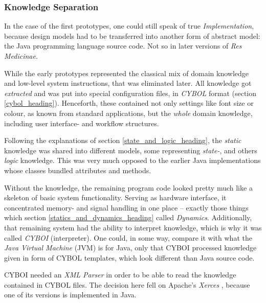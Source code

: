%
%
%
%
%
%
%

\subsubsection{Knowledge Separation}
\label{knowledge_separation_heading}

In the case of the first prototypes, one could still speak of true
\emph{Implementation}, because design models had to be transferred into another
form of abstract model: the Java programming language source code. Not so in
later versions of \emph{Res Medicinae}.

While the early prototypes represented the classical mix of domain knowledge
and low-level system instructions, that was eliminated later. All knowledge got
\emph{extracted} and was put into special configuration files, in \emph{CYBOL}
format (section \ref{cybol_heading}). Henceforth, these contained not only
settings like font size or colour, as known from standard applications, but the
\emph{whole} domain knowledge, including user interface- and workflow structures.

Following the explanations of section \ref{state_and_logic_heading}, the
\emph{static} knowledge was shared into different models, some representing
\emph{state-}, and others \emph{logic} knowledge. This was very much opposed to
the earlier Java implementations whose classes bundled attributes and methods.

Without the knowledge, the remaining program code looked pretty much like a
skeleton of basic system functionality. Serving as hardware interface, it
concentrated memory- and signal handling in one place -- exactly those things
which section \ref{statics_and_dynamics_heading} called \emph{Dynamics}.
Additionally, that remaining system had the ability to interpret knowledge,
which is why it was called \emph{CYBOI} (interpreter). One could, in some way,
compare it with what the \emph{Java Virtual Machine} (JVM) is for Java, only
that CYBOI processed knowledge given in form of CYBOL templates, which look
different than Java source code.

CYBOI needed an \emph{XML Parser} in order to be able to read the knowledge
contained in CYBOL files. The decision here fell on Apache's \emph{Xerces}
\cite{xerces}, because one of its versions is implemented in Java.
